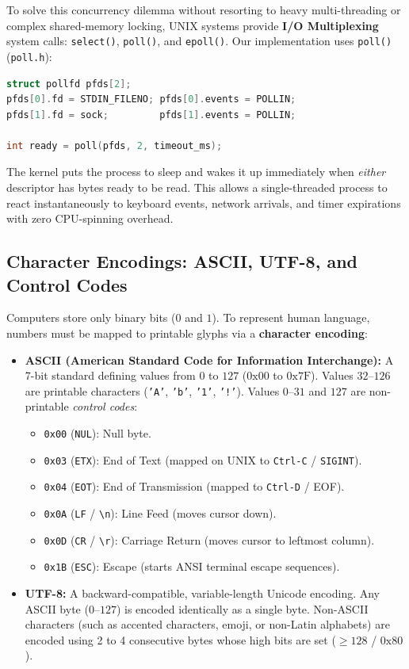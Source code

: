 To solve this concurrency dilemma without resorting to heavy multi-threading or complex shared-memory locking, UNIX systems provide \textbf{I/O Multiplexing} system calls: \texttt{select()}, \texttt{poll()}, and \texttt{epoll()}. Our implementation uses \texttt{poll()} (\texttt{poll.h}):

\begin{lstlisting}[language=C]
struct pollfd pfds[2];
pfds[0].fd = STDIN_FILENO; pfds[0].events = POLLIN;
pfds[1].fd = sock;         pfds[1].events = POLLIN;

int ready = poll(pfds, 2, timeout_ms);
\end{lstlisting}
The kernel puts the process to sleep and wakes it up immediately when \textit{either} descriptor has bytes ready to be read. This allows a single-threaded process to react instantaneously to keyboard events, network arrivals, and timer expirations with zero CPU-spinning overhead.

\subsection{Character Encodings: ASCII, UTF-8, and Control Codes}

Computers store only binary bits ($0$ and $1$). To represent human language, numbers must be mapped to printable glyphs via a \textbf{character encoding}:
\begin{itemize}[leftmargin=1.5em]
    \item \textbf{ASCII (American Standard Code for Information Interchange):} A 7-bit standard defining values from $0$ to $127$ ($0\text{x}00$ to $0\text{x}7\text{F}$). Values $32$--$126$ are printable characters (\texttt{'A'}, \texttt{'b'}, \texttt{'1'}, \texttt{'!'}). Values $0$--$31$ and $127$ are non-printable \textit{control codes}:
    \begin{itemize}
        \item \texttt{0x00} (\texttt{NUL}): Null byte.
        \item \texttt{0x03} (\texttt{ETX}): End of Text (mapped on UNIX to \texttt{Ctrl-C} / \texttt{SIGINT}).
        \item \texttt{0x04} (\texttt{EOT}): End of Transmission (mapped to \texttt{Ctrl-D} / EOF).
        \item \texttt{0x0A} (\texttt{LF} / \texttt{\textbackslash n}): Line Feed (moves cursor down).
        \item \texttt{0x0D} (\texttt{CR} / \texttt{\textbackslash r}): Carriage Return (moves cursor to leftmost column).
        \item \texttt{0x1B} (\texttt{ESC}): Escape (starts ANSI terminal escape sequences).
    \end{itemize}
    \item \textbf{UTF-8:} A backward-compatible, variable-length Unicode encoding. Any ASCII byte ($0$--$127$) is encoded identically as a single byte. Non-ASCII characters (such as accented characters, emoji, or non-Latin alphabets) are encoded using 2 to 4 consecutive bytes whose high bits are set ($\ge 128$ / $0\text{x}80$).
\end{itemize}

